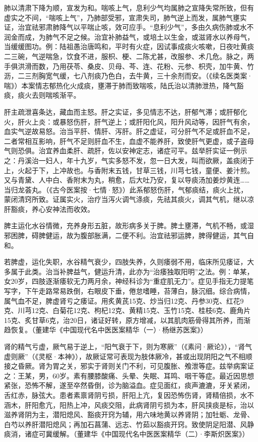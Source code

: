 \documentclass[draft,12pt]{ctexbook}
\begin{document}
肺以清肃下降为顺，宣发为和。喘咳上气，息利少气均属肺之宣降失常所致，但有虚实之不间，“喘咳上气”，乃肺部受邪，宣肃失司，肺气逆上而发，属肺气壅实证，治宜祛邪肃肺降气以平喘止咳，效可应手。“息利少气”，多由久病伤肺或水不润金而成，为肺气不足之候。治宜补肺益气，或培土以生金，或滋肾水以养母气，当缓缓图功。例：陆祖愚治唐鸣和，平时有火症，因试事成痰火咳嗽，日夜吐黄痰二三碗，气逆喘急，饮食不进，服枳、梗、二陈尤甚，改服参、术几危。脉之，两手俱洪滑而数，乃用茯苓、桑皮、贝母、芩、连、花粉、元参、枳壳，加牛黄、竹沥，二三剂胸宽气缓，七八剂痰乃色白，去牛黄，三十余剂而安。（《续名医类案·喘》）本案情志郁热化火成痰，壅滞于肺而致喘咳，陆氏治以清肺泄热，降气豁痰，痰火去则喘咳渐平。

肝主疏泄喜条达，藏血而主怒。肝之实证，多见情志不达，肝郁气滞；或肝郁化火，肝火上炎：或暴怒伤肝，肝气逆上；或肝阳化风，阳升风动等，因肝气有余，血实气逆故易怒。治当平肝、情肝、泻肝。肝之虚证，可分肝气不足或肝血不足，二者常相互影响，肝气不足则肝血不生，血虚不能养肝，致使肝气更虚，或子盗母气则恐俱。治宜养血柔肝、疏肝，佐以安神定志，诸症可平。兹举肝实证一例示之：丹溪治一妇人，年十九岁，气实多怒不发，忽一日大发，叫而欲厥，盖痰闭于上，火起于下，上冲故也。与香附末五钱，甘草三钱，川芎七钱，童便、姜汁煎。又与青黛、人中白、香附末为丸，稍愈，后大吐乃安，复以导痰汤加姜炒黄连……当归龙荟丸。（《古今医案按·七情·怒》）此系郁怒伤肝，气郁痰结，痰火上扰，蒙闭清窍所致。证属实火，治疗当泻火调气涤痰，先祛其痰火，调其气机，继以凉肝豁痰，养心安神法而收效。

脾主运化水谷情微，充养身形五脏，故形病多关于脾。脾土壅滞，气机不畅，或湿邪困脾，碍脾健运，故为腹部胀满，二便不利。治宜祛邪运脾，脾得健运，其气自和。

若脾虚，运化失职，水谷精气衰少，四肢失养，久则痿弱不用，临床所见痿证，大多属于此类。治当补脾益气，健运升清，此亦为“治痿独取阳明”之法。例：单某，女20岁，四肢逐渐痿软无力两月余，神经科诊为“重症肌无力”。症见手指无力提笔写字，下午走路常易跌倒，右眼皮下垂，倦怠嗜睡，苔薄白，脉沉细。综合病情，属气血不足，脾虚肾亏之痿证。用炙黄芪15克、炒当归12克、丹参30克、红花9克、川芎12克、白菊花12克、枸杞12克、黄精15克、玉竹15克、桂枝6克、鹿角片15克、炙甘草6克，治20日，诸证好转，原方增减，以其肌肉筋骨得其所养，而渐趋恢复。（董建华《中国现代名中医医案精华（一）·杨继苏医案》）

肾的精气亏虚，厥气易于逆上，“阳气衰于下，则为寒厥”（《素问·厥论》），“肾气虚则厥”（《灵枢·本神》），故厥证常可表现为肢体厥冷，甚或出现阴阳之气不相顺接之昏厥。肾为胃之关，邪实于肾则关门不利，可见腹胀、飧泄等症。兹举病案证之：王某，男，60岁。素有腰膝酸痛、头晕、失眠、耳鸣、咽干等症。最近因思想紧张，恐怖不解，遂至卒然昏倒，诊为脑溢血。症见面红，痰声漉漉，牙关紧闭，舌红赤，脉弦大。患者素禀肾阴亏损，肝阳上亢，复因恐怖伤肾，肾精倍损，水不涵木，肝阳愈亢，阳热上冲，风痰交阻，此病肾阴亏损为本，肝风挟痰是标，治以滋养肾阴为主，潜阳熄风、豁痰开窍为辅，用六味地黄以养肾阴；加牡蛎、龙骨、白芍以养肝潜阳熄风；再加石菖蒲、远志、竹茹以豁痰开窍。致使阴足阳潜、风静痰消，诸症可冀缓解。（董建华《中国现代名中医医案精华（二）·李斯炽医案》）
\end{document}
